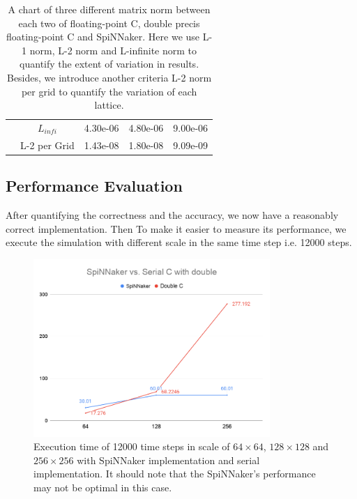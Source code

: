 \begin{table}[tb]
\begin{tabular}{|c|c|c|c|c|}
                     & $L_{infi}$  & 4.30e-06         & 4.80e-06           & 9.00e-06           \\ \cline{2-5} 
                     & L-2 per Grid & 1.43e-08           & 1.80e-08            & 9.09e-09              \\ \hline
\end{tabular}
\caption{A chart of three different matrix norm between each two of floating-point C, double precis floating-point C and SpiNNaker. Here we use L-1 norm, L-2 norm and L-infinite norm to quantify the extent of variation in results. Besides, we introduce another criteria L-2 norm per grid to quantify the variation of each lattice.}
\label{table:norm}
\end{table}

\subsection{Performance Evaluation} \label{sec:perfe}
After quantifying the correctness and the accuracy, we now have a reasonably correct implementation. Then To make it easier to measure its performance, we execute the simulation with different scale in the same time step i.e. 12000 steps.\\

\begin{figure}[tb]
   \centering
       \includegraphics[width=0.8\textwidth]{figures/SpiNNaker vs. Serial C with double.png}
       \caption{Execution time of 12000 time steps in scale of $64\times64$, $128\times128$ and $256\times256$ with SpiNNaker implementation and serial implementation. It should note that the SpiNNaker's performance may not be optimal in this case.}
       \label{fig:performance}
\end{figure}

